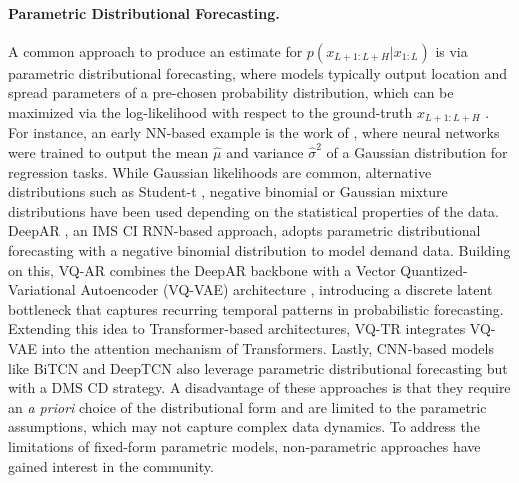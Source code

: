 \documentclass[a4paper,oneside,bibliography=totoc]{scrbook}
\begin{document}
\paragraph{Parametric Distributional Forecasting.} A common approach to produce an estimate for $p(x_{L+1:L+H} | x_{1:L})$ is via parametric distributional forecasting, where models typically output location and spread parameters of a pre-chosen probability distribution, which can be maximized via the log-likelihood with respect to the ground-truth $x_{L+1:L+H}$ \cite{bergsma_c2far_2022}. 
For instance, an early NN-based example is the work of \citet{nix_estimating_1994}, where neural networks were trained to output the mean $\hat{\mu}$ and variance $\hat{\sigma}^2$ of a Gaussian distribution for regression tasks.
While Gaussian likelihoods are common, alternative distributions such as Student-t \cite{alexandrov_gluonts_2020}, negative binomial \cite{salinas_deepar_2020} or Gaussian mixture distributions \cite{mukherjee_ar-mdn_2018} have been used depending on the statistical properties of the data. 
DeepAR \cite{salinas_deepar_2020}, an IMS CI RNN-based approach, adopts parametric distributional forecasting with a negative binomial distribution to model demand data.
Building on this, VQ-AR \cite{rasul_vq-ar_2022} combines the DeepAR backbone with a Vector Quantized-Variational Autoencoder (VQ-VAE) architecture \cite{van_den_oord_neural_2017}, introducing a discrete latent bottleneck that captures recurring temporal patterns in probabilistic forecasting.
Extending this idea to Transformer-based architectures, VQ-TR \cite{rasul_vq-tr_2023} integrates VQ-VAE into the attention mechanism of Transformers.
Lastly, CNN-based models like BiTCN \cite{sprangers_parameter-efficient_2023} and DeepTCN \cite{chen_probabilistic_2019} also leverage parametric distributional forecasting but with a DMS CD strategy. 
A disadvantage of these approaches is that they require an \textit{a priori} choice of the distributional form and are limited to the parametric assumptions, which may not capture complex data dynamics. 
To address the limitations of fixed-form parametric models, non-parametric approaches have gained interest in the community.
\end{document}
